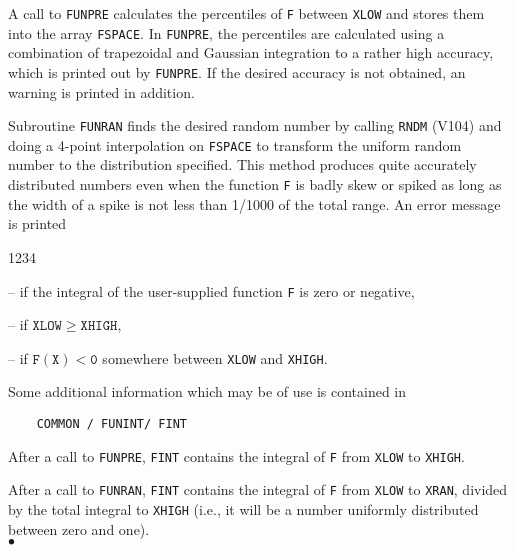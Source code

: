 A call to {\tt FUNPRE} calculates the percentiles of {\tt F} between
{\tt XLOW} and stores them into the array {\tt FSPACE}.
\Method
In {\tt FUNPRE}, the percentiles are calculated using a combination of
trapezoidal and Gaussian integration to a rather high accuracy,
which is printed out by {\tt FUNPRE}. If the desired accuracy is not
obtained, an warning is printed in addition.
\par
Subroutine {\tt FUNRAN} finds the desired random number by calling
{\tt RNDM} (V104) and doing a 4-point interpolation on {\tt FSPACE}
to transform the uniform random number to the distribution specified.
This method produces quite accurately distributed numbers even when
the function {\tt F} is badly skew or spiked as long as the width
of a spike is not less than 1/1000 of the total range.
\newpage
\Errorh
An error message is printed
\begin{DLtt}{1234}
\item[] -- if the integral of the user-supplied function {\tt F} is zero
or negative,
\item[] -- if $\mathtt{XLOW \geq XHIGH}$,
\item[] -- if $\mathtt{F(X) < 0}$ somewhere between {\tt XLOW} and
{\tt XHIGH}.
\end{DLtt}
\Notes
Some additional information which may be of use is contained in
\begin{verbatim}
    COMMON / FUNINT/ FINT
\end{verbatim}
After a call to {\tt FUNPRE}, {\tt FINT} contains the integral of
{\tt F} from {\tt XLOW} to {\tt XHIGH}.
\par
After a call to {\tt FUNRAN}, {\tt FINT} contains the integral of
{\tt F} from {\tt XLOW} to {\tt XRAN}, divided by the total integral
to {\tt XHIGH} (i.e., it will be a number uniformly distributed
between zero and  one).
\\ $\bullet$
